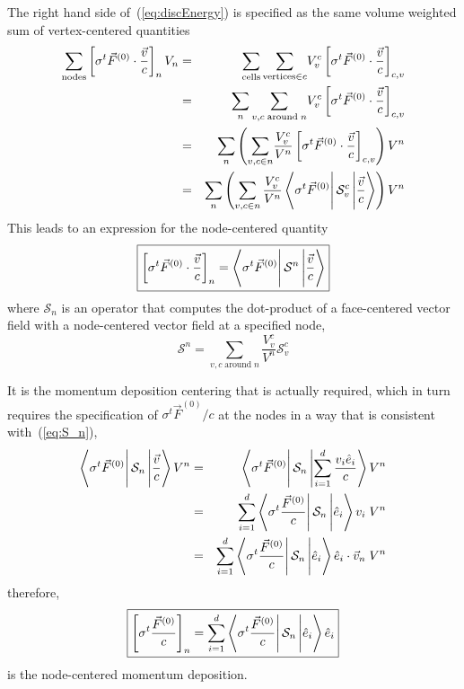 \documentclass[12pt]{article}
\newcommand{\bracket}[3]{%
  \ensuremath{%
       \left\langle {#1} \rule{0mm}{4ex} \right|%
       {#2} \left| {#3}  \rule{0mm}{4ex} \right\rangle%
  }%
}
\begin{document}
The right hand side of~(\ref{eq:discEnergy}) is specified as 
the same
volume weighted sum of vertex-centered quantities
\begin{eqnarray}
\sum_{\text{nodes}}
      \left[ \sigma^{t} \vec{F}^{(0)} \cdot \frac{\vec{v}}{c} \right]_{n} V_{n}
  &=& \sum_{\text{cells}} 
      \sum_{\text{vertices} \in c} \! V^{c}_{v}
       \left[ \sigma^{t} \vec{F}^{(0)} \cdot \frac{\vec{v}}{c}
        \right]_{c,v} \\
  &=& \sum_{n} 
      \sum_{v,c \;\text{around}\; n} \! V^{c}_{v}
       \left[ \sigma^{t} \vec{F}^{(0)} \cdot \frac{\vec{v}}{c}
        \right]_{c,v} \\
  &=& \sum_{n} \left( 
      \sum_{v,c \in n} \! \frac{V^{c}_{v}}{V^{n}}
       \left[ \sigma^{t} \vec{F}^{(0)} \cdot \frac{\vec{v}}{c}
        \right]_{c,v} \right) V^{n} \\
  &=& \sum_{n} \left( \sum_{ v,c \in n} \frac{V^{c}_{v}}{V^{n}}
        \bracket{\sigma^{t} \vec{F}^{(0)}}
                {\mathcal{S}^{c}_{v}}{\frac{\vec{v}}{c}} \right) V^{n}
\end{eqnarray}
This leads to an expression for the node-centered quantity
\begin{equation}
\boxed{
  \left[ \sigma^{t} \vec{F}^{(0)} \cdot \frac{\vec{v}}{c} \right]_{n}
    = \bracket{\sigma^{t} \vec{F}^{(0)}}{\mathcal{S}^{n}}{\frac{\vec{v}}{c}}
}
\end{equation}
where $\mathcal{S}_{n}$ is an operator that computes the dot-product
of a face-centered vector field with a node-centered vector field at
a specified node,
\begin{equation}
 \boxed{
   \mathcal{S}^{n} = \sum_{ v,c \; \text{around} \; n}
                        \frac{V^{c}_{v}}{V^{n}}\mathcal{S}^{c}_{v}
 }
\label{eq:S_n}
\end{equation}

It is the momentum deposition centering that
is actually required, which in turn requires
the specification of $\sigma^{t} \vec{F}^{(0)} / c$ at the nodes in
a way that
is consistent with~(\ref{eq:S_n}),
\begin{eqnarray}
   \bracket{\sigma^{t} \vec{F}^{(0)}}
                       {\mathcal{S}_{n}}
                       {\frac{\vec{v}}{c}} V^{n}
  &=&  \bracket{\sigma^{t} \vec{F}^{(0)}}
                       {\mathcal{S}_{n}}
                       {\sum_{i=1}^{d} \frac{v_{i}\hat{e}_{i}}{c}} V^{n}
   \\
  &=&  \sum_{i=1}^{d} \bracket{\sigma^{t} \frac{\vec{F}^{(0)}}{c}}
                       {\mathcal{S}_{n}}
                       {\hat{e}_{i}}v_{i} \; V^{n}
   \\
  &=&  \sum_{i=1}^{d} \bracket{\sigma^{t} \frac{\vec{F}^{(0)}}{c}}
                       {\mathcal{S}_{n}}
                       {\hat{e}_{i}} \hat{e}_{i} \cdot \vec{v}_{n}
                         \; V^{n}
\end{eqnarray}
therefore,
\begin{equation}
 \boxed{
\left[ \sigma^{t} \frac{\vec{F}^{(0)}}{c} \right]_{n}
    = \sum_{i=1}^{d} \bracket{\sigma^{t} \frac{\vec{F}^{(0)}}{c}}
                       {\mathcal{S}_{n}}
                       {\hat{e}_{i}} \hat{e}_{i}
}
\end{equation}
is the node-centered momentum deposition.
\end{document}
